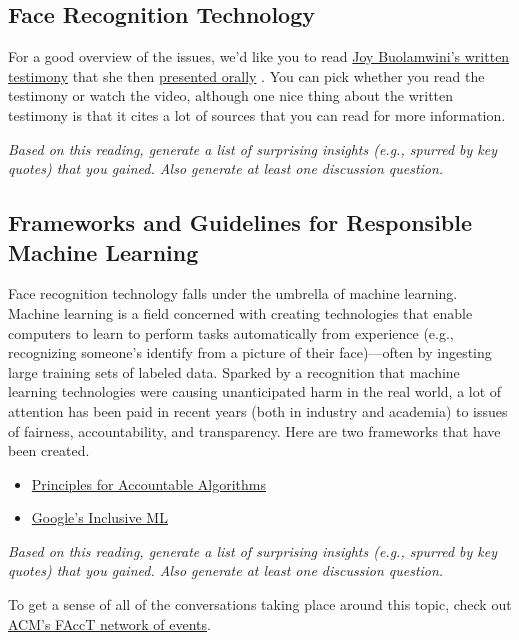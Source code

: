 \subsection{Face Recognition Technology}


\begin{prob}
For a good overview of the issues, we'd like you to read \href{https://docs.house.gov/meetings/GO/GO00/20190522/109521/HHRG-116-GO00-Wstate-BuolamwiniJ-20190522.pdf}{Joy Buolamwini's written testimony} that she then \href{https://youtu.be/jLmzEFkbNsg?t=2910}{presented orally} .  You can pick whether you read the testimony or watch the video, although one nice thing about the written testimony is that it cites a lot of sources that you can read for more information.

\emph{Based on this reading, generate a list of surprising insights (e.g., spurred by key quotes) that you gained.  Also generate at least one discussion question.}
\end{prob}

\subsection{Frameworks and Guidelines for Responsible Machine Learning}

\begin{prob}
Face recognition technology falls under the umbrella of machine learning.  Machine learning is a field concerned with creating technologies that enable computers to learn to perform tasks automatically from experience (e.g., recognizing someone's identify from a picture of their face)---often by ingesting large training sets of labeled data.  Sparked by a recognition that machine learning technologies were causing unanticipated harm in the real world, a lot of attention has been paid in recent years (both in industry and academia) to issues of fairness, accountability, and transparency.  Here are two frameworks that have been created.
\begin{itemize}
\item \href{https://www.fatml.org/resources/principles-for-accountable-algorithms}{Principles for Accountable Algorithms}
\item \href{https://cloud.google.com/inclusive-ml/}{Google's Inclusive ML}
\end{itemize}

\emph{Based on this reading, generate a list of surprising insights (e.g., spurred by key quotes) that you gained.  Also generate at least one discussion question.}

To get a sense of all of the conversations taking place around this topic, check out \href{https://facctconference.org/network/}{ACM's FAccT network of events}.
\end{prob}

